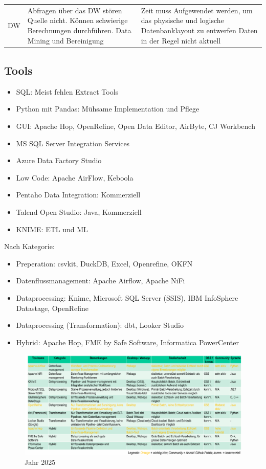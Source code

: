 \documentclass[../Main.tex]{subfiles}
\begin{document}
\begin{table}[H]
    \begin{tabularx}{\columnwidth}{X|X|X}
        DW &
        Abfragen über das DW stören Quelle nicht. Können schwierige Berechnungen durchführen. Data Mining und Bereinigung &
        Zeit muss Aufgewendet werden, um das physische und logische Datenbanklayout zu entwerfen
        Daten in der Regel nicht aktuell
    \end{tabularx}
\end{table}

\subsection{Tools}
\begin{itemize}
    \item SQL: Meist fehlen Extract Tools
    \item Python mit Pandas: Mühsame Implementation und Pflege
    \item GUI: Apache Hop, OpenRefine, Open Data Editor, AirByte, CJ Workbench
    \item MS SQL Server Integration Services
    \item Azure Data Factory Studio
    \item Low Code: Apache AirFlow, Keboola
    \item Pentaho Data Integration: Kommerziell
    \item Talend Open Studio: Java, Kommerziell
    \item KNIME: ETL und ML
\end{itemize}

Nach Kategorie:
\begin{itemize}
    \item Preperation: csvkit, DuckDB, Excel, Openrefine, OKFN
    \item Datenflussmanagement: Apache Airflow, Apache NiFi
    \item Dataprocessing: Knime, Microsoft SQL Server (SSIS), IBM InfoSphere Datastage, OpenRefine
    \item Dataprocessing (Transformation): dbt, Looker Studio
    \item Hybrid: Apache Hop, FME by Safe Software, Informatica PowerCenter
\end{itemize}
\begin{figure}[H]
    \centering
    \includegraphics[width=1\linewidth]{Images/datan/etl-tools.png}
    \caption{Jahr 2025}
\end{figure}
\end{document}

